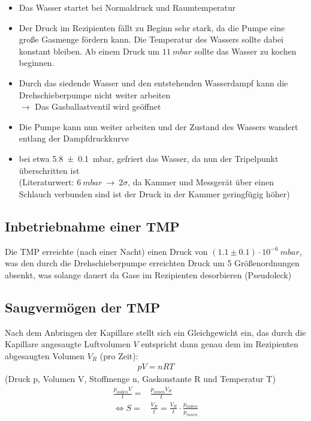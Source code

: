 \documentclass[12pt, a4paper]{scrartcl}
\begin{document}
        \begin{itemize}
            \item Das Wasser startet bei Normaldruck und Raumtemperatur
            
            \item Der Druck im Rezipienten fällt zu Beginn sehr stark, da die Pumpe eine große Gasmenge fördern kann. Die Temperatur des Wassers sollte dabei konstant bleiben. Ab einem Druck um $11\ mbar$ sollte das Wasser zu kochen beginnen.
            
            \item Durch das siedende Wasser und den entstehenden Wasserdampf kann die Drehschieberpumpe nicht weiter arbeiten\\
            $\rightarrow$ Das Gasballastventil wird geöffnet
            
            \item Die Pumpe kann nun weiter arbeiten und der Zustand des Wassers wandert entlang der Dampfdruckkurve
            
            \item bei etwa \SI{5.8\pm 0.1}{\milli \bar}, gefriert das Wasser, da nun der Tripelpunkt überschritten ist\\(Literaturwert: $6\ mbar\ \rightarrow\ 2\sigma$, da Kammer und Messger\"at \"uber einen Schlauch verbunden sind ist der Druck in der Kammer geringf\"ugig h\"oher)
        \end{itemize}

    \subsection{Inbetriebnahme einer TMP}
    
        Die TMP erreichte (nach einer Nacht) einen Druck von 
        $(1.1\pm 0.1)\cdot10^{-6}\ mbar$, 
        was den durch die Drehschieberpumpe erreichten Druck um 5
        Größenordnungen absenkt, was solange dauert da Gase im Rezipienten desorbieren (Pseudoleck)
        
    \subsection{Saugvermögen der TMP}
        
        Nach dem Anbringen der Kapillare stellt sich ein Gleichgewicht ein, das durch die Kapillare angesaugte Luftvolumen $V$ entspricht dann genau dem im Rezipienten abgesaugten Volumen $V_R$ (pro Zeit):
        \begin{align}
            pV=nRT
        \end{align}
        (Druck p, Volumen V, Stoffmenge n, Gaskonstante R und Temperatur T)
        \begin{align}
            \frac{p_{außen}V}{t} =& \frac{p_{innen}V_R}{t}\\
            \Leftrightarrow S=&\frac{V_R}{t}=\frac{V_R}{t}\cdot \frac{p_{außen}}{p_{innen}}
        \end{align}
	
\end{document}
